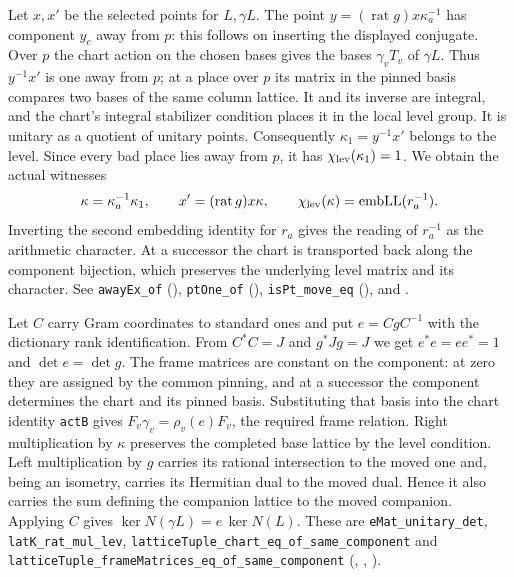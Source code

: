 Let \(x,x'\) be the selected points for \(L,\gamma L\).
The point \(y=(\operatorname{rat}g)x\kappa_a^{-1}\) has component
\(y_c\) away from \(p\): this follows on inserting the displayed
conjugate. Over \(p\) the chart action on the chosen bases gives the
bases \(\gamma_vT_v\) of \(\gamma L\). Thus \(y^{-1}x'\) is one away
from \(p\); at a place over \(p\) its matrix in the pinned basis
compares two bases of the same column lattice. It and its inverse
are integral, and the chart's integral stabilizer condition places it
in the local level group. It is unitary as a quotient of unitary
points. Consequently \(\kappa_1=y^{-1}x'\) belongs to the level.
Since every bad place lies away from \(p\), it has
\(\chi_{\rm lev}(\kappa_1)=1\). We obtain the actual witnesses
\[
 \kappa=\kappa_a^{-1}\kappa_1,\qquad
 x'=(\operatorname{rat}g)x\kappa,\qquad
 \chi_{\rm lev}(\kappa)=\operatorname{embLL}(r_a^{-1}).
\]
Inverting the second embedding identity for \(r_a\) gives the reading of
\(r_a^{-1}\) as the arithmetic character. At a successor the chart is
transported back along the component bijection, which preserves the
underlying level matrix and its character.
See \nolinkurl{awayEx_of} (),
\nolinkurl{ptOne_of} (),
\nolinkurl{isPt_move_eq} (),
and .

Let \(C\) carry Gram coordinates to standard ones and put \(e=CgC^{-1}\)
with the dictionary rank identification. From \(C^*C=J\) and
\(g^*Jg=J\) we get \(e^*e=ee^*=1\) and \(\det e=\det g\).
The frame matrices are constant on the component: at zero they
are assigned by the common pinning, and at a successor the component
determines the chart and its pinned basis. Substituting that basis into
the chart identity \nolinkurl{actB} gives
\(F_v\gamma_v=\rho_v(e)F_v\), the required frame relation.
Right multiplication by \(\kappa\) preserves the completed base lattice
by the level condition. Left multiplication by \(g\) carries its
rational intersection to the moved one and, being an isometry, carries
its Hermitian dual to the moved dual. Hence it also carries the sum
defining the companion lattice to the moved companion. Applying \(C\)
gives \(\ker N(\gamma L)=e\,\ker N(L)\).
These are \nolinkurl{eMat_unitary_det}, \nolinkurl{latK_rat_mul_lev},
\nolinkurl{latticeTuple_chart_eq_of_same_component} and
\nolinkurl{latticeTuple_frameMatrices_eq_of_same_component}
(,
,
).

